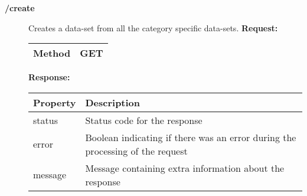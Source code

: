 \begin{description}
\item[\textbf{/create}]
Creates a data-set from all the category specific data-sets.
\newline
\newline
\textbf{Request:}
\newline
\newline
\begin{tabular}{ | l | l |}
\hline
Method & GET\\ \hline
\end{tabular}
\newline
\newline
\textbf{Response:}
\newline
\newlines
\resizebox{\textwidth}{!} {
\begin{tabular}{ | l | l |}
\hline
\textbf{Property} & \textbf{Description}\\ \hline
status & Status code for the response\\ \hline
error & Boolean indicating if there was an error during the processing of the request\\ \hline
message & Message containing extra information about the response\\ \hline
\end{tabular}}


\end{description}
